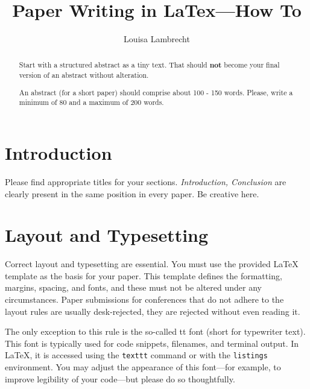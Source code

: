 \documentclass[sigconf,nonacm,screen]{acmart}
\begin{document}
 
 
\title{Paper Writing in LaTex---How To}

\author{Louisa Lambrecht}

\begin{abstract}
  Start with a structured abstract as a tiny text. That should \textbf{not} become your final version of an abstract without alteration.
  
  An abstract (for a short paper) should comprise about 100 - 150 words. Please, write a minimum of 80 and a maximum of 200 words.
\end{abstract}


\maketitle

\section{Introduction}

Please find appropriate titles for your sections. \textit{Introduction, Conclusion} are clearly present in the same position in every paper. Be creative here.


\section{Layout and Typesetting}

Correct layout and typesetting are essential. You must use the provided LaTeX template as the basis for your paper. This template defines the formatting, margins, spacing, and fonts, and these must not be altered under any circumstances. Paper submissions for conferences that do not adhere to the layout rules are usually desk-rejected, \ie{} they are rejected without even reading it. 

The only exception to this rule is the so-called tt font (short for typewriter text). This font is typically used for code snippets, filenames, and terminal output. In LaTeX, it is accessed using the \texttt{texttt} command or with the \texttt{listings} environment. You may adjust the appearance of this font---for example, to improve legibility of your code---but please do so thoughtfully.
\end{document}
